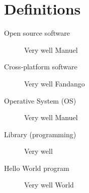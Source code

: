\chapter{Definitions}

\begin{description}
	\item [Open source software]
	Very well Manuel

	\item [Cross-platform software]
	Very well Fandango

	\item [Operative System (OS)]
	Very well Manuel

	\item [Library (programming)]
	Very well 

	\item [Hello World program]
	Very well World

\end{description}

